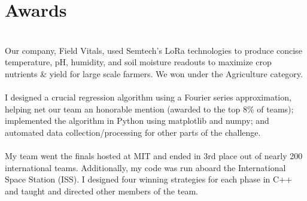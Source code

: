 \documentclass[]{deedy-resume-openfont}
\begin{document}
\section{Awards}
  \\
Our company, Field Vitals, used Semtech's LoRa technologies to produce concise temperature, pH, humidity, and soil moisture
readouts to maximize crop nutrients & yield for large scale farmers. We won under the Agriculture category.\\
\sectionsep
{}  \\
I designed a crucial regression algorithm using a Fourier series approximation, helping net our team an honorable mention (awarded to the top 8\% of teams); implemented the algorithm in Python using matplotlib and numpy; and automated data collection/processing for other parts of the challenge.\\
\sectionsep
{}  \\
My team went the finals hosted at MIT and ended in 3rd place out of nearly 200 international teams. Additionally, my code was run aboard the International Space Station (ISS). I designed four winning strategies for each phase in C++ and taught and directed other members of the team.\\
\sectionsep
\
\end{document}
